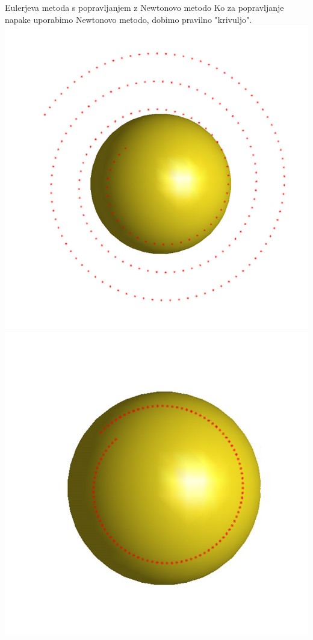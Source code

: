 \documentclass{beamer}
\begin{document}
\begin{frame}{Eulerjeva metoda s popravljanjem z Newtonovo metodo}
	Ko za popravljanje napake uporabimo Newtonovo metodo, dobimo pravilno "krivuljo".
	\includegraphics[scale=0.2]{eul2}
	\includegraphics[scale=0.2]{eul1}

\end{frame}
\end{document}
